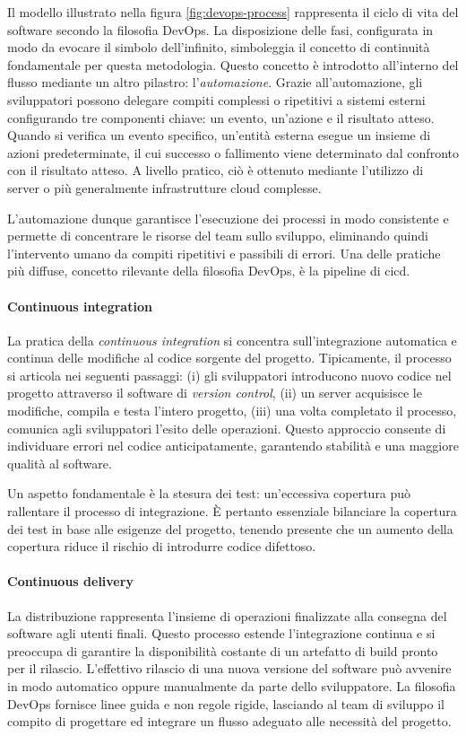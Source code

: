 Il modello illustrato nella figura \ref{fig:devops-process} rappresenta il ciclo di vita del software secondo la filosofia DevOps. La disposizione delle fasi, configurata in modo da evocare il simbolo dell'infinito, simboleggia il concetto di continuità fondamentale per questa metodologia. Questo concetto è introdotto all'interno del flusso mediante un altro pilastro: l'\textit{automazione}. Grazie all'automazione, gli sviluppatori possono delegare compiti complessi o ripetitivi a sistemi esterni configurando tre componenti chiave: un evento, un'azione e il risultato atteso. Quando si verifica un evento specifico, un'entità esterna esegue un insieme di azioni predeterminate, il cui successo o fallimento viene determinato dal confronto con il risultato atteso. A livello pratico, ciò è ottenuto mediante l'utilizzo di server o più generalmente infrastrutture cloud complesse.

L'automazione dunque garantisce l'esecuzione dei processi in modo consistente e permette di concentrare le risorse del team sullo sviluppo, eliminando quindi l'intervento umano da compiti ripetitivi e passibili di errori. Una delle pratiche più diffuse, concetto rilevante della filosofia DevOps, è la pipeline di \ac{cicd}.

\paragraph{Continuous integration} La pratica della \textit{continuous integration} si concentra sull'integrazione automatica e continua delle modifiche al codice sorgente del progetto. Tipicamente, il processo si articola nei seguenti passaggi: (i) gli sviluppatori introducono nuovo codice nel progetto attraverso il software di \textit{version control}, (ii) un server acquisisce le modifiche, compila e testa l'intero progetto, (iii) una volta completato il processo, comunica agli sviluppatori l'esito delle operazioni. Questo approccio consente di individuare errori nel codice anticipatamente, garantendo stabilità e una maggiore qualità al software.

Un aspetto fondamentale è la stesura dei test: un'eccessiva copertura può rallentare il processo di integrazione. È pertanto essenziale bilanciare la copertura dei test in base alle esigenze del progetto, tenendo presente che un aumento della copertura riduce il rischio di introdurre codice difettoso.

\paragraph{Continuous delivery} La distribuzione rappresenta l'insieme di operazioni finalizzate alla consegna del software agli utenti finali. Questo processo estende l'integrazione continua e si preoccupa di garantire la disponibilità costante di un artefatto di build pronto per il rilascio. L'effettivo rilascio di una nuova versione del software può avvenire in modo automatico oppure manualmente da parte dello sviluppatore. La filosofia DevOps fornisce linee guida e non regole rigide, lasciando al team di sviluppo il compito di progettare ed integrare un flusso adeguato alle necessità del progetto.

